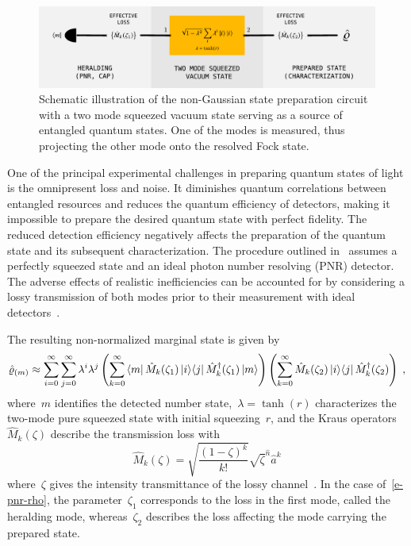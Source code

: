 \documentclass{article}
\begin{document}
\begin{figure}[h]
  \begin{center}
    \includegraphics[width = 1.00 \columnwidth]{import/illustrate_scheme_alt.pdf}
  \end{center}
  \caption{
    Schematic illustration of the non-Gaussian state preparation circuit with a two mode squeezed vacuum state serving as a source of entangled quantum states. One of the modes is measured, thus projecting the other mode onto the resolved Fock state. 
  }
  \label{f-scheme}
\end{figure}

One of the principal experimental challenges in preparing quantum states of light is the omnipresent loss and noise. It diminishes quantum correlations between entangled resources and reduces the quantum efficiency of detectors, making it impossible to prepare the desired quantum state with perfect fidelity. The reduced detection efficiency negatively affects the preparation of the quantum state and its subsequent characterization. The procedure outlined in~ assumes a perfectly squeezed state and an ideal photon number resolving (PNR) detector. The adverse effects of realistic inefficiencies can be accounted for by considering a lossy transmission of both modes prior to their measurement with ideal detectors~\cite{feito2009}.

The resulting non-normalized marginal state is given by
%
\begin{equation}\label{e-pnr-rho}
  \hatrho_{(m)} \approx
  \sum_{i = 0}^{\infty} 
  \sum_{j = 0}^{\infty}
    \lambda^{i} \lambda^{j}
    \left(
      \sum_{k = 0}^{\infty}
        \bra{m} \hat{M}_{k} (\zeta_{1}) \ketbra{i}{j} \hat{M}_{k}^{\dagger} (\zeta_{1}) \ket{m}
    \right)
    \left(
      \sum_{k = 0}^{\infty}
        \hat{M}_{k}(\zeta_{2}) \ketbra{i}{j} \hat{M}_{k}^{\dagger} (\zeta_{2})
    \right) \Qc
\end{equation}
%
where~$m$ identifies the detected number state,~${\lambda = \tanh(r)}$ characterizes the two-mode pure squeezed state with initial squeezing~$r$, and the Kraus operators~${\hat{M}_{k} (\zeta)}$ describe the transmission loss with
%
\begin{equation}
  \hat{M}_{k} (\zeta) =
    \sqrt{ \frac{(1 - \zeta)^{k}}{k!} } 
    \sqrt{\zeta}^{\hat{n}} \hat{a}^{k}
\end{equation}
%
where~$\zeta$ gives the intensity transmittance of the lossy channel~\cite{ivan2011}. In the case of~\eqref{e-pnr-rho}, the parameter~$\zeta_{1}$ corresponds to the loss in the first mode, called the heralding mode, whereas~$\zeta_{2}$ describes the loss affecting the mode carrying the prepared state.
\end{document}
